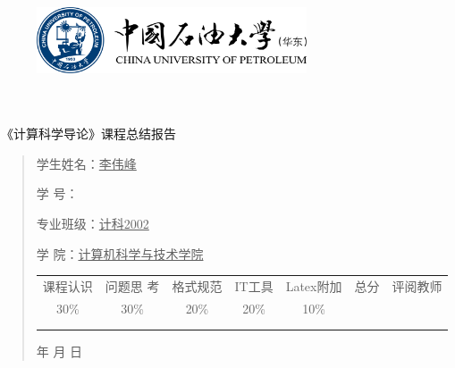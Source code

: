 \documentclass{article}
\renewcommand{\today}{\number\year 年 \number\month 月 \number\day 日}
\begin{document}
\begin{figure}
    \centering
    \includegraphics[width=8cm]{upc.png}

    \label{figupc}
\end{figure}

	\begin{center}
		\quad \\
		\quad \\
		\heiti \fontsize{45}{17} \quad \quad \quad 
		\vskip 1.5cm
		\heiti {} 《计算科学导论》课程总结报告
	\end{center}
	\vskip 2.0cm
		
	\begin{quotation}
		\doublespacing
		
        \par\setlength\parindent{7em}
		\quad 

		学生姓名：\underline{\qquad  李伟峰 \qquad \qquad}

		学\hspace{0.61cm} 号：\underline{\qquad}
		
		专业班级：\underline{\qquad 计科2002 \qquad  }
		
        学\hspace{0.61cm} 院：\underline{计算机科学与技术学院}
		\vskip 2cm
		\centering
		\begin{table}[h]
            \centering 
            \begin{tabular}{|c|c|c|c|c|c|c|}
                \hline
                课程认识 & 问题思 考 & 格式规范  & IT工具  & Latex附加  & 总分 & 评阅教师 \\
                30\% & 30\% & 20\% & 20\% & 10\% &  &  \\
                \hline
                 & & & & & &\\
                & & & & & &\\
                \hline
            \end{tabular}
        \end{table}
		\vskip 2cm
		\today
	\end{quotation}
\end{document}
